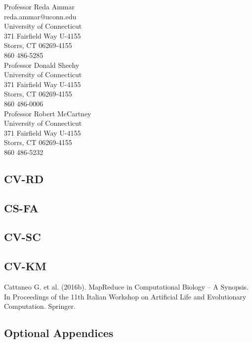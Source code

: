 \documentclass[]{article}
\begin{document}
 	Professor Reda Ammar\\
 	reda.ammar@uconn.edu\\
 	University of Connecticut\\
 	371 Fairfield Way U-4155\\
 	Storrs, CT 06269-4155\\
 	860 486-5285\\
 	
 	\noindent Professor Donald Sheehy\\
 	University of Connecticut\\
 	371 Fairfield Way U-4155\\
 	Storrs, CT 06269-4155\\
 	860 486-0006\\
 	
 	\noindent Professor Robert McCartney\\
 	University of Connecticut\\
 	371 Fairfield Way U-4155\\
 	Storrs, CT 06269-4155\\
 	860 486-5232
 	
 
 	
 	
 \subsection{CV-RD}
 \subsection{CS-FA}
 \subsection{CV-SC}
 \subsection{CV-KM}

 
 
 
 
 
 
  Cattaneo G. et al.   (2016b). MapReduce in Computational Biology – A Synopsis. In Proceedings of the 11th Italian Workshop on Artificial Life and Evolutionary Computation. Springer.
 \newpage
 \subsection{Optional Appendices} %
 
\end{document}
